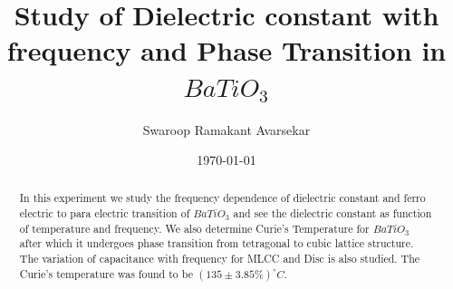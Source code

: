 \documentclass[a4paper, amsfonts, amssymb, amsmath, reprint, showkeys, nofootinbib, twoside]{revtex4-1}
\begin{document}
\title{Study of Dielectric constant with frequency and Phase Transition  in $BaTiO_3$}
\author{Swaroop Ramakant Avarsekar}
\date{\today}
	
\begin{abstract}
In this experiment we study the frequency dependence of dielectric constant and ferro electric to para electric transition of $BaTiO_3$ and see the dielectric constant as function of temperature and frequency. We also determine Curie's Temperature for $BaTiO_3$ after which it undergoes phase transition from tetragonal to cubic lattice structure. The variation of capacitance with frequency for MLCC and Disc is also studied. The Curie's temperature was found to be $(135\pm3.85\%)^\circ C$.
\end{abstract}
	
	
\maketitle
\end{document}
